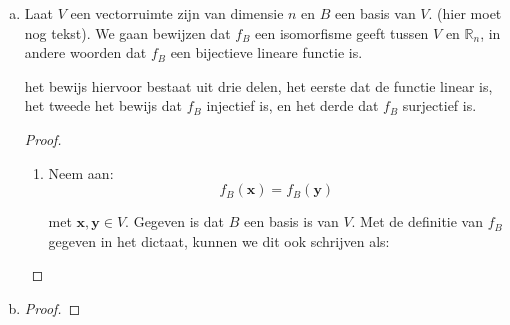 \documentclass[12pt, a4paper]{article}
\begin{document}
\begin{enumerate}[(a).]
    \item \label{c}
        Laat $V$ een vectorruimte zijn van dimensie $n$ en $B$ een basis van $V$. (hier moet nog tekst). \newline
        We gaan bewijzen dat $f_B$ een isomorfisme geeft tussen $V$ en $\mathbb{R}_n$, in andere woorden dat $f_B$ een bijectieve lineare functie is.

        het bewijs hiervoor bestaat uit drie delen, het eerste dat de functie linear is, het tweede het bewijs dat $f_B$ injectief is, en het derde dat $f_B$ surjectief is.

        \newpage
        \begin{proof}\leavevmode
            \begin{enumerate}[1.]
                \item 
                Neem aan: 
                \begin{equation} \label{verg1}
                    f_B(\mathbf{x}) = f_B(\mathbf{y})
                \end{equation}
                
                met $\mathbf{x}, \mathbf{y} \in V$. Gegeven is dat $B$ een basis is van $V$. Met de definitie van $f_B$ gegeven in het dictaat, kunnen we dit ook schrijven als:
                    

            \end{enumerate}
        \end{proof}


 
        \item \label{d}
    
\begin{proof}
   
\end{proof}

\end{enumerate}
\end{document}
